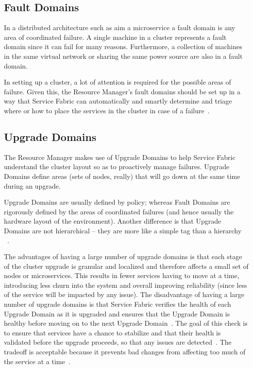 \subsection{Fault Domains}
In a distributed architecture such as aim a microservice a fault
domain is any area of coordinated failure. A single machine in a cluster
represents a fault domain since it can fail for many reasons. 
Furthermore, a collection of
machines in the same virtual network or sharing the same power source
are also in a fault domain.

In setting up a cluster, a lot of attention is required for the
possible areas of failure. Given this, the Resource Manager's fault 
domains should be set
up in a way that Service Fabric can automatically and smartly determine and
triage where or how to place the services in the cluster in case of a
failure~\cite{hid-sp18-501-fig2and3}.

\subsection{Upgrade Domains}
The Resource Manager makes use of Upgrade Domains to help Service Fabric
understand the cluster layout so as to proactively manage failures. 
Upgrade Domains define areas (sets of
nodes, really) that will go down at the same time during an upgrade.

Upgrade Domains are usually defined by policy;
whereas Fault Domains are rigorously defined by the areas of
coordinated failures (and hence usually the hardware layout of the
environment). Another difference is that Upgrade Domains are not
hierarchical – they are more like a simple tag than a hierarchy
~\cite{hid-sp18-501-fig2and3}.

The advantages of having a large number of upgrade domains is that
each stage of the cluster upgrade is granular and localized and
therefore affects a small set of nodes or microservices. This results
in fewer services having to move at a time, introducing less churn
into the system and overall improving reliability (since less of the
service will be impacted by any issue).  The disadvantage of having a
large number of upgrade domains is that Service Fabric verifies the
health of each Upgrade Domain as it is upgraded and ensures that the
Upgrade Domain is healthy before moving on to the next Upgrade
Domain~\cite{hid-sp18-501-fig2and3}.  The goal of this check is to
ensure that services have a chance to stabilize and that their health
is validated before the upgrade proceeds, so that any issues are
detected~\cite{hid-sp18-501-fig2and3}.  The tradeoff is acceptable
because it prevents bad changes from affecting too much of the service
at a time~\cite{hid-sp18-501-fig2and3}.

